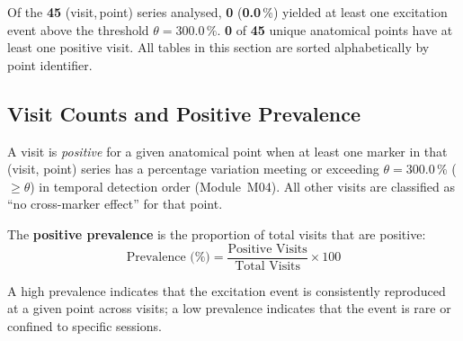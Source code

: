 \documentclass[a4paper,11pt]{article}
\begin{document}
\noindent
Of the \textbf{45} (visit,\,point) series analysed,
\textbf{0} (\textbf{0.0}\,\%) yielded at least one
excitation event above the threshold $\theta = 300.0\,\%$.
\textbf{0} of \textbf{45} unique anatomical points
have at least one positive visit.
All tables in this section are sorted alphabetically by point identifier.

\subsection{Visit Counts and Positive Prevalence}

A visit is \emph{positive} for a given anatomical point when at least one marker in that
(visit, point) series has a percentage variation meeting or exceeding
$\theta = 300.0\,\%$ ($\geq \theta$) in temporal detection order (Module~M04).
All other visits are classified as ``no cross-marker effect'' for that point.

The \textbf{positive prevalence} is the proportion of total visits that are positive:
\[
  \text{Prevalence (\%)} = \frac{\text{Positive Visits}}{\text{Total Visits}} \times 100
\]

A high prevalence indicates that the excitation event is consistently reproduced at a given
point across visits; a low prevalence indicates that the event is rare or confined to
specific sessions.
\end{document}
